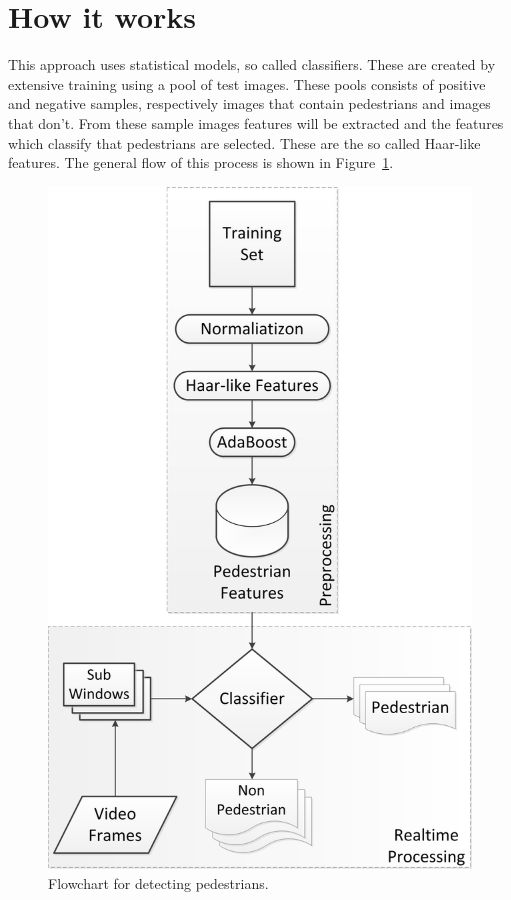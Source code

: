 \documentclass{article}
\begin{document}
\section{How it works}
This approach uses statistical models, so called classifiers. These are created by extensive training using a pool of test images. These pools consists of positive and negative samples, respectively images that contain pedestrians and images that don't. 
From these sample images features will be extracted and the features which classify that pedestrians are selected. These are the so called Haar-like features. The general flow of this process is shown in Figure~\ref{fig:flowchart}.
\begin{figure}[h!]
	\centering
	\includegraphics[scale=0.5]{HaarTrainingFlowChart.png}
	\caption{Flowchart for detecting pedestrians.}
	\label{fig:flowchart}
\end{figure}
\end{document}
